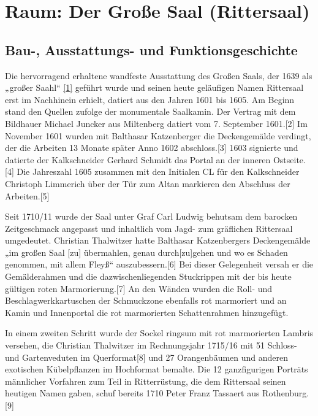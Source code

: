 \documentclass[
  a4paper,
  openany]{book}
\begin{document}
\chapter{Raum: Der Große Saal
(Rittersaal)}\label{raum-der-grouxdfe-saal-rittersaal}

\section{Bau-, Ausstattungs- und
Funktionsgeschichte}\label{bau--ausstattungs--und-funktionsgeschichte}

Die hervorragend erhaltene wandfeste Ausstattung des Großen Saals, der
1639 als „großer Saahl``
\href{https://www.deckenmalerei.eu/edit/451519cf-21f1-45da-b455-d7e7268ed471\#_ftn1}{{[}1{]}}
geführt wurde und seinen heute geläufigen Namen Rittersaal erst im
Nachhinein erhielt, datiert aus den Jahren 1601 bis 1605. Am Beginn
stand den Quellen zufolge der monumentale Saalkamin. Der Vertrag mit dem
Bildhauer Michael Juncker aus Miltenberg datiert vom 7. September
1601.{[}2{]} Im November 1601 wurden mit Balthasar Katzenberger die
Deckengemälde verdingt, der die Arbeiten 13 Monate später Anno 1602
abschloss.{[}3{]} 1603 signierte und datierte der Kalkschneider Gerhard
Schmidt das Portal an der inneren Ostseite.{[}4{]} Die Jahreszahl 1605
zusammen mit den Initialen CL für den Kalkschneider Christoph Limmerich
über der Tür zum Altan markieren den Abschluss der Arbeiten.{[}5{]}

Seit 1710/11 wurde der Saal unter Graf Carl Ludwig behutsam dem barocken
Zeitgeschmack angepasst und inhaltlich vom Jagd- zum gräflichen
Rittersaal umgedeutet. Christian Thalwitzer hatte Balthasar
Katzenbergers Deckengemälde „im großen Saal {[}zu{]} übermahlen, genau
durch{[}zu{]}gehen und wo es Schaden genommen, mit allem Fleyß``
auszubessern.{[}6{]} Bei dieser Gelegenheit versah er die Gemälderahmen
und die dazwischenliegenden Stuckrippen mit der bis heute gültigen roten
Marmorierung.{[}7{]} An den Wänden wurden die Roll- und
Beschlagwerkkartuschen der Schmuckzone ebenfalls rot marmoriert und an
Kamin und Innenportal die rot marmorierten Schattenrahmen hinzugefügt.

In einem zweiten Schritt wurde der Sockel ringsum mit rot marmorierten
Lambris versehen, die Christian Thalwitzer im Rechnungsjahr 1715/16 mit
51 Schloss- und Gartenveduten im Querformat{[}8{]} und 27 Orangenbäumen
und anderen exotischen Kübelpflanzen im Hochformat bemalte. Die 12
ganzfigurigen Porträts männlicher Vorfahren zum Teil in Ritterrüstung,
die dem Rittersaal seinen heutigen Namen gaben, schuf bereits 1710 Peter
Franz Tassaert aus Rothenburg.{[}9{]}
\end{document}

